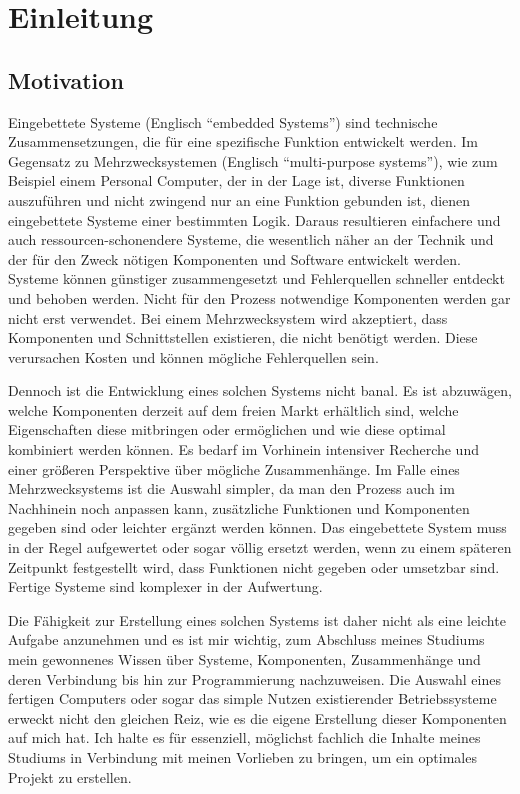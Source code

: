 \hypertarget{einleitung}{%
\chapter{Einleitung}\label{einleitung}}

\hypertarget{motivation}{%
\section{Motivation}\label{motivation}}

Eingebettete Systeme (Englisch ``embedded Systems'') sind technische
Zusammensetzungen, die für eine spezifische Funktion entwickelt werden.
Im Gegensatz zu Mehrzwecksystemen (Englisch ``multi-purpose systems''),
wie zum Beispiel einem Personal Computer, der in der Lage ist, diverse
Funktionen auszuführen und nicht zwingend nur an eine Funktion gebunden
ist, dienen eingebettete Systeme einer bestimmten Logik. Daraus
resultieren einfachere und auch ressourcen-schonendere Systeme, die
wesentlich näher an der Technik und der für den Zweck nötigen
Komponenten und Software entwickelt werden. Systeme können günstiger
zusammengesetzt und Fehlerquellen schneller entdeckt und behoben werden.
Nicht für den Prozess notwendige Komponenten werden gar nicht erst
verwendet. Bei einem Mehrzwecksystem wird akzeptiert, dass Komponenten
und Schnittstellen existieren, die nicht benötigt werden. Diese
verursachen Kosten und können mögliche Fehlerquellen sein.

Dennoch ist die Entwicklung eines solchen Systems nicht banal. Es ist
abzuwägen, welche Komponenten derzeit auf dem freien Markt erhältlich
sind, welche Eigenschaften diese mitbringen oder ermöglichen und wie
diese optimal kombiniert werden können. Es bedarf im Vorhinein
intensiver Recherche und einer größeren Perspektive über mögliche
Zusammenhänge. Im Falle eines Mehrzwecksystems ist die Auswahl simpler,
da man den Prozess auch im Nachhinein noch anpassen kann, zusätzliche
Funktionen und Komponenten gegeben sind oder leichter ergänzt werden
können. Das eingebettete System muss in der Regel aufgewertet oder sogar
völlig ersetzt werden, wenn zu einem späteren Zeitpunkt festgestellt
wird, dass Funktionen nicht gegeben oder umsetzbar sind. Fertige Systeme
sind komplexer in der Aufwertung.

Die Fähigkeit zur Erstellung eines solchen Systems ist daher nicht als
eine leichte Aufgabe anzunehmen und es ist mir wichtig, zum Abschluss
meines Studiums mein gewonnenes Wissen über Systeme, Komponenten,
Zusammenhänge und deren Verbindung bis hin zur Programmierung
nachzuweisen. Die Auswahl eines fertigen Computers oder sogar das simple
Nutzen existierender Betriebssysteme erweckt nicht den gleichen Reiz,
wie es die eigene Erstellung dieser Komponenten auf mich hat. Ich halte
es für essenziell, möglichst fachlich die Inhalte meines Studiums in
Verbindung mit meinen Vorlieben zu bringen, um ein optimales Projekt zu
erstellen.

